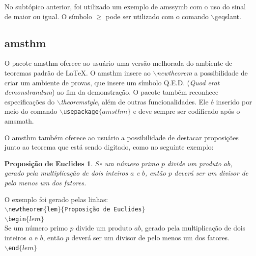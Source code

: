 \documentclass[12pt]{article}
\begin{document}
			No subtópico anterior, foi utilizado um exemplo de amssymb com o uso do sinal de maior ou igual. O símbolo $\geqslant$ pode ser utilizado com o comando $\backslash$geqslant.
		
		\subsection{amsthm}
			O pacote amsthm oferece ao usuário uma versão melhorada do ambiente de teoremas padrão de \LaTeX. O amsthm insere ao \textit{$\backslash$newtheorem} a possibilidade de criar um ambiente de provas, que insere um símbolo Q.E.D. (\textit{Quod erat demonstrandum}) ao fim da demonstração. O pacote também reconhece especificações do \textit{$\backslash$theoremstyle}, além de outras funcionalidades. Ele é inserido por meio do comando \texttt{$\backslash$usepackage$\{amsthm\}$} e deve sempre ser codificado após o amsmath.
			
			O amsthm também oferece ao usuário a possibilidade de destacar proposições junto ao teorema que está sendo digitado, como no seguinte exemplo:
			
			\newtheorem{lem}{Proposição de Euclides}
			\begin{lem}
				Se um número primo $p$ divide um produto $ab$, gerado pela multiplicação de dois inteiros $a$ e $b$, então $p$ deverá ser um divisor de pelo menos um dos fatores.
			\end{lem}
		
			O exemplo foi gerado pelas linhas:\\
			\texttt{$\backslash$newtheorem$\{$lem$\}\{$Proposição de Euclides$\}$}\\
			\texttt{$\backslash$begin$\{lem\}$}\\
			Se um número primo $p$ divide um produto $ab$, gerado pela multiplicação de dois inteiros $a$ e $b$, então $p$ deverá ser um divisor de pelo menos um dos fatores.\\
			\texttt{$\backslash$end$\{lem\}$}
			
		
\end{document}
